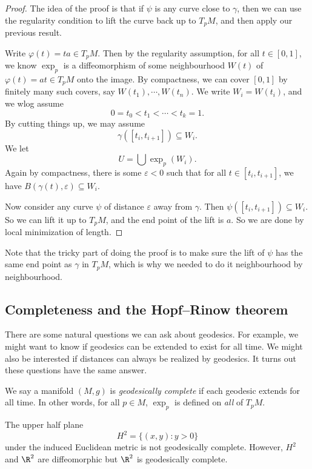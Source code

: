 \documentclass[a4paper]{article}
\begin{document}
\begin{proof}
  The idea of the proof is that if $\psi$ is any curve close to $\gamma$, then we can use the regularity condition to lift the curve back up to $T_p M$, and then apply our previous result.

  Write $\varphi(t) = ta \in T_p M$. Then by the regularity assumption, for all $t \in [0, 1]$, we know $\exp_p$ is a diffeomorphism of some neighbourhood $W(t)$ of $\varphi(t) = at \in T_p M$ onto the image. By compactness, we can cover $[0, 1]$ by finitely many such covers, say $W(t_1), \cdots, W(t_n)$. We write $W_i = W(t_i)$, and we wlog assume
  \[
    0 = t_0 < t_1 < \cdots < t_k = 1.
  \]
  By cutting things up, we may assume
  \[
    \gamma([t_i, t_{i + 1}]) \subseteq W_i.
  \]
  We let
  \[
    U = \bigcup \exp_p (W_i).
  \]
  Again by compactness, there is some $\varepsilon < 0$ such that for all $t \in [t_i, t_{i + 1}]$, we have $B(\gamma(t), \varepsilon) \subseteq W_i$.

  Now consider any curve $\psi$ of distance $\varepsilon$ away from $\gamma$. Then $\psi([t_i, t_{i + 1}]) \subseteq W_i$. So we can lift it up to $T_p M$, and the end point of the lift is $a$. So we are done by local minimization of length.
\end{proof}
Note that the tricky part of doing the proof is to make sure the lift of $\psi$ has the same end point as $\gamma$ in $T_p M$, which is why we needed to do it neighbourhood by neighbourhood.

\subsection{Completeness and the Hopf--Rinow theorem}
There are some natural questions we can ask about geodesics. For example, we might want to know if geodesics can be extended to exist for all time. We might also be interested if distances can always be realized by geodesics. It turns out these questions have the same answer.

\begin{defi}
  We say a manifold $(M, g)$ is \emph{geodesically complete} if each geodesic extends for all time. In other words, for all $p \in M$, $\exp_p$ is defined on \emph{all} of $T_p M$.
\end{defi}

\begin{eg}
  The upper half plane
  \[
    H^2 = \{(x, y) : y> 0\}
  \]
  under the induced Euclidean metric is not geodesically complete. However, $H^2$ and $\R^2$ are diffeomorphic but $\R^2$ is geodesically complete.
\end{eg}
\end{document}
